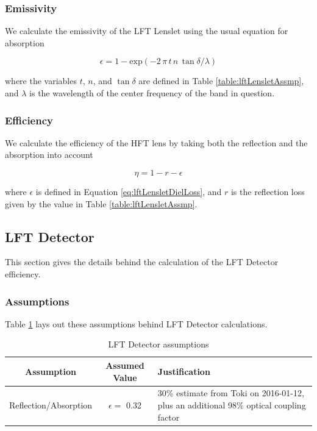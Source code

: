 \documentclass[12pt, titlepage]{article} %
\begin{document}
\subsubsection{Emissivity}

We calculate the emissivity of the LFT Lenslet using the usual equation for absorption

\begin{equation}
	\epsilon = 1 - \mathrm{exp} (- 2 \, \pi \, t \, n \, \tan{\delta} / \lambda )
	\label{eq:lftLensletDielLoss}
\end{equation}

where the variables $t$, $n$, and $\tan{\delta}$ are defined in Table \ref{table:lftLensletAssmp}, and $\lambda$ is the wavelength of the center frequency of the band in question.


\subsubsection{Efficiency}

We calculate the efficiency of the HFT lens by taking both the reflection and the absorption into account

\begin{equation}
	\eta = 1 - r - \epsilon
\end{equation}

where $\epsilon$ is defined in Equation \ref{eq:lftLensletDielLoss}, and $r$ is the reflection loss given by the value in Table \ref{table:lftLensletAssmp}.


\subsection{LFT Detector}

This section gives the details behind the calculation of the LFT Detector efficiency.


\subsubsection{Assumptions}

Table \ref{table:lftDetAssmp} lays out these assumptions behind LFT Detector calculations.

\begin{table}[H]
	\centering
	\begin{tabularx}{\textwidth}{|| c | c | X ||}
	\hline
	Assumption & Assumed Value & Justification \\
	\hline
	\hline
	Reflection/Absorption & $\epsilon =$ 0.32 & 30\% estimate from Toki on 2016-01-12, plus an additional 98\% optical coupling factor \\
	\hline
	\end{tabularx}
\caption{LFT Detector assumptions \label{table:lftDetAssmp}}
\end{table}
\end{document}
